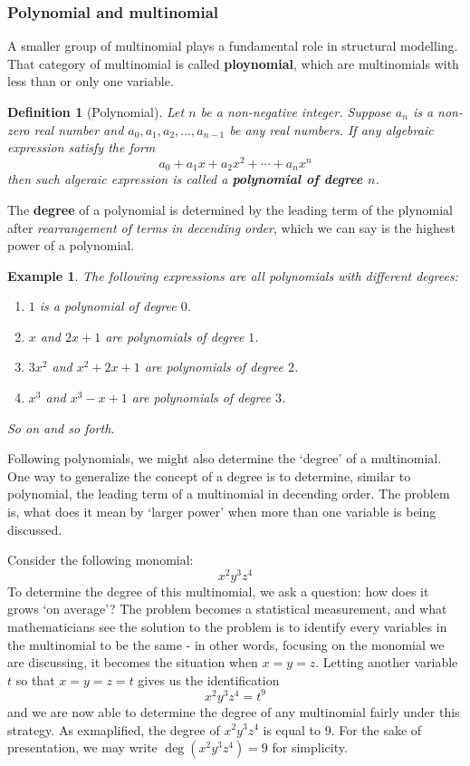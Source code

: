 \documentclass[12pt]{article}
\newtheorem{definition}{Definition}[section]
\newtheorem*{example}{Example}
\begin{document}
    \subsubsection*{Polynomial and multinomial}

    A smaller group of multinomial plays a fundamental role in structural modelling. That category of multinomial is called \textbf{ploynomial}, which are multinomials with less than or only one variable.

    \begin{definition}[Polynomial]
        Let $n$ be a non-negative integer. Suppose $a_n$ is a non-zero real number and $a_0, a_1, a_2, \dots, a_{n-1}$ be any real numbers. If any algebraic expression satisfy the form \[a_0+a_1 x+a_2 x^2 + \cdots + a_n x^n\] then such algeraic expression is called a \textbf{polynomial of degree $n$}.
    \end{definition}

    The \textbf{degree} of a polynomial is determined by the leading term of the plynomial after \textit{rearrangement of terms in decending order}, which we can say is the highest power of a polynomial.

    \begin{example}
        The following expressions are all polynomials with different degrees:
        \begin{enumerate}
            \item $1$ is a polynomial of degree $0$.
            \item $x$ and $2x+1$ are polynomials of degree $1$.
            \item $3x^2$ and $x^2+2x+1$ are polynomials of degree $2$.
            \item $x^3$ and $x^3-x+1$ are polynomials of degree $3$.
        \end{enumerate}
        So on and so forth.
    \end{example}

    Following polynomials, we might also determine the `degree' of a multinomial. One way to generalize the concept of a degree is to determine, similar to polynomial, the leading term of a multinomial in decending order. The problem is, what does it mean by `larger power' when more than one variable is being discussed.

    Consider the following monomial: \[x^2 y^3 z^4\]
    To determine the degree of this multinomial, we ask a question: how does it grows `on average'? The problem becomes a statistical measurement, and what mathematicians see the solution to the problem is to identify every variables in the multinomial to be the same - in other words, focusing on the monomial we are discussing, it becomes the situation when $x=y=z$. Letting another variable $t$ so that $x=y=z=t$ gives us the identification \[x^2 y^3 z^4 = t^9\] and we are now able to determine the degree of any multinomial fairly under this strategy. As exmaplified, the degree of $x^2 y^3 z^4$ is equal to $9$. For the sake of presentation, we may write $\deg(x^2 y^3 z^4)=9$ for simplicity.
\end{document}
